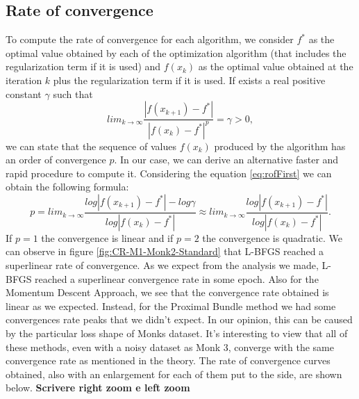 \subsection{Rate of convergence}
\label{sec:rate_of_convergence}
To compute the rate of convergence for each algorithm, we consider $f^*$ as the optimal value obtained by each of the optimization algorithm (that includes the regularization term if it is used) and $f(x_{k})$ as the optimal value obtained at the iteration $k$ plus the regularization term if it is used. If exists a real positive constant $\gamma$ such that
\begin{equation}
\label{eq:rofFirst}
lim_{k\to \infty}\frac{|f(x_{k+1}) - f^* |}{|f(x_{k}) - f^*|^p} = \gamma > 0,
\end{equation}
we can state that the sequence of values $f(x_{k})$ produced by the algorithm has an order of convergence $p$. In our case, we can derive an alternative faster and rapid procedure to compute it. Considering the equation \ref{eq:rofFirst} we can obtain the following formula: 
\begin{equation}
p = lim_{k\to \infty}\frac{log |f(x_{k+1}) - f^* | - log \gamma}{log|f(x_{k}) - f^*|} \approx lim_{k\to \infty}\frac{log |f(x_{k+1}) - f^* |}{log|f(x_{k}) - f^*|}.
\end{equation}
If $p=1$ the convergence is linear and if $p=2$ the convergence is quadratic. We can observe in figure \ref{fig:CR-M1-Monk2-Standard} that L-BFGS reached a superlinear rate of convergence. 
As we expect from the analysis we made, L-BFGS reached a superlinear convergence rate in some epoch. Also for the Momentum Descent Approach, we see that the convergence rate obtained is linear as we expected. Instead, for the Proximal Bundle method we had some convergences rate peaks that we didn't expect. In our opinion, this can be caused by the particular loss shape of Monks dataset.
It's interesting to view that all of these methods, even with a noisy dataset as Monk 3, converge with the same convergence rate as mentioned in the theory. The rate of convergence curves obtained, also with an enlargement for each of them put to the side, are shown below.
\textbf{Scrivere right zoom e left zoom}

